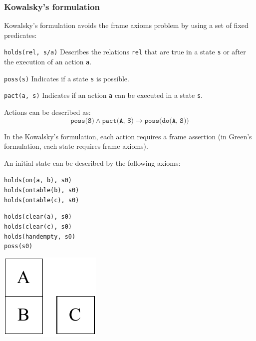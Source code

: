 \subsubsection{Kowalsky's formulation}
Kowalsky's formulation avoids the frame axioms problem by using a set of fixed predicates:
\begin{descriptionlist}
    \item[\texttt{holds(rel, s/a)}] 
        Describes the relations \texttt{rel} that are true in a state \texttt{s} or after the execution of an action \texttt{a}.
    \item[\texttt{poss(s)}]
        Indicates if a state \texttt{s} is possible.
    \item[\texttt{pact(a, s)}]  
        Indicates if an action \texttt{a} can be executed in a state \texttt{s}.
\end{descriptionlist}
Actions can be described as:
\[ \texttt{poss(S)} \land \texttt{pact(A, S)} \rightarrow \texttt{poss(do(A, S))} \]

In the Kowalsky's formulation, each action requires a frame assertion (in Green's formulation, each state requires frame axioms).

\begin{example}
    An initial state can be described by the following axioms:\\[0.5em]
    \begin{minipage}{.35\linewidth}
        \centering
        \texttt{holds(on(a, b), s0)} \\
        \texttt{holds(ontable(b), s0)} \\
        \texttt{holds(ontable(c), s0)} \\
    \end{minipage}
    \begin{minipage}{.35\linewidth}
        \centering
        \texttt{holds(clear(a), s0)} \\
        \texttt{holds(clear(c), s0)} \\
        \texttt{holds(handempty, s0)} \\
        \texttt{poss(s0)} \\
    \end{minipage}
    \begin{minipage}{.2\linewidth}
        \centering
        \includegraphics[width=0.6\linewidth]{img/_moving_block_example_kowalsky.pdf}
    \end{minipage}\\[0.5em]
\end{example}

